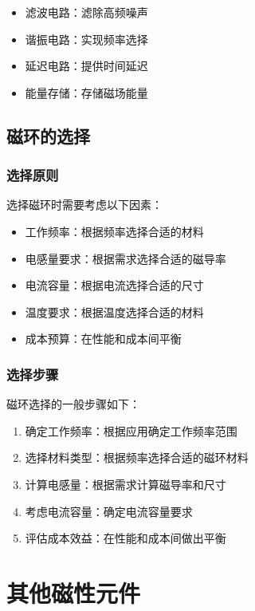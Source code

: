 \documentclass[12pt,UTF8]{ctexbook}
\begin{document}
\begin{itemize}[leftmargin=2cm]
    \item 滤波电路：滤除高频噪声
    \item 谐振电路：实现频率选择
    \item 延迟电路：提供时间延迟
    \item 能量存储：存储磁场能量
\end{itemize}

\section{磁环的选择}

\subsection{选择原则}

选择磁环时需要考虑以下因素：

\begin{itemize}[leftmargin=2cm]
    \item 工作频率：根据频率选择合适的材料
    \item 电感量要求：根据需求选择合适的磁导率
    \item 电流容量：根据电流选择合适的尺寸
    \item 温度要求：根据温度选择合适的材料
    \item 成本预算：在性能和成本间平衡
\end{itemize}

\subsection{选择步骤}

磁环选择的一般步骤如下：

\begin{enumerate}[leftmargin=2cm]
    \item 确定工作频率：根据应用确定工作频率范围
    \item 选择材料类型：根据频率选择合适的磁环材料
    \item 计算电感量：根据需求计算磁导率和尺寸
    \item 考虑电流容量：确定电流容量要求
    \item 评估成本效益：在性能和成本间做出平衡
\end{enumerate}

\chapter{其他磁性元件}
\end{document}
